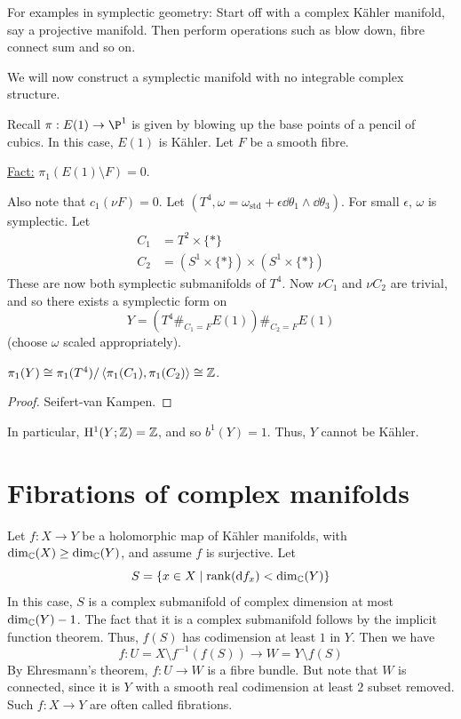 \documentclass{article}
\begin{document}
For examples in symplectic geometry: Start off with a complex K\"ahler manifold, say a projective manifold. Then perform operations such as blow down, fibre connect sum and so on.

\lec

We will now construct a symplectic manifold with no integrable complex structure.

Recall \(\pi : E(1) \to \P^1\) is given by blowing up the base points of a pencil of cubics. In this case, \(E(1)\) is K\"ahler. Let \(F\) be a smooth fibre.

\underline{Fact:} \(\pi_1(E(1)\setminus F) = 0\).

Also note that \(c_1(\nu F) = 0\). Let \((T^4, \omega = \omega_{\text{std}} + \epsilon\dd\theta_1 \wedge \dd\theta_3)\). For small \(\epsilon\), \(\omega\) is symplectic. Let
\begin{align*}
    C_1 &= T^2 \times \{*\} \\
    C_2 &= (S^1 \times \{*\}) \times (S^1 \times \{*\})
\end{align*}
These are now both symplectic submanifolds of \(T^4\). Now \(\nu C_1\) and \(\nu C_2\) are trivial, and so there exists a symplectic form on 
\[Y = (T^4 \#_{C_1 = F} E(1)) \#_{C_2 = F} E(1)\]
(choose \(\omega\) scaled appropriately).

\begin{proposition}
    \(\pi_1(Y) \cong \pi_1(T^4)/\left\langle \pi_1(C_1), \pi_1(C_2) \right\rangle \cong \mathbb{Z}\).
\end{proposition}

\begin{proof}
    Seifert-van Kampen.
\end{proof}

In particular, \(\mathrm{H}^1(Y; \mathbb{Z}) = \mathbb{Z}\), and so \(b^1(Y) = 1\). Thus, \(Y\) cannot be K\"ahler.

\section{Fibrations of complex manifolds}

Let \(f : X \to Y\) be a holomorphic map of K\"ahler manifolds, with \(\dim_{\mathbb{C}}(X) \ge \dim_{\mathbb{C}}(Y)\), and assume \(f\) is surjective. Let
\[S = \{x \in X \mid \rank(\dd f_x) < \dim_{\mathbb{C}}(Y)\}\]
In this case, \(S\) is a complex submanifold of complex dimension at most \(\dim_{\mathbb{C}}(Y) - 1\).  The fact that it is a complex submanifold follows by the implicit function theorem. Thus, \(f(S)\) has codimension at least \(1\) in \(Y\). Then we have
\[f : U = X \setminus f^{-1}(f(S)) \to W = Y \setminus f(S)\]
By Ehresmann's theorem, \(f : U \to W\) is a fibre bundle. But note that \(W\) is connected, since it is \(Y\) with a smooth real codimension at least \(2\) subset removed. Such \(f : X \to Y\) are often called fibrations.
\end{document}
